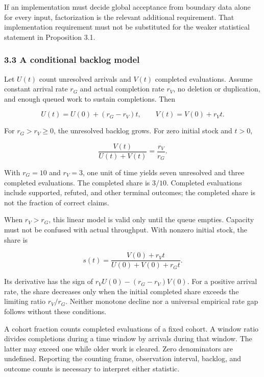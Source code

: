 \documentclass[
  10pt,
]{article}
\begin{document}
If an implementation must decide global acceptance from boundary data alone for every input, factorization is the relevant additional requirement. That implementation requirement must not be substituted for the weaker statistical statement in Proposition 3.1.

\subsubsection{3.3 A conditional backlog model}\label{a-conditional-backlog-model}

Let \hypertarget{math-E0055-0059}{}{\(U(t)\)} count unresolved arrivals and \hypertarget{math-E0056-0060}{}{\(V(t)\)} completed evaluations. Assume constant arrival rate \hypertarget{math-E0057-0061}{}{\(r_G\)} and actual completion rate \hypertarget{math-E0058-0062}{}{\(r_V\)}, no deletion or duplication, and enough queued work to sustain completions. Then

\hypertarget{math-E0059-0063}{}{\[U(t)=U(0)+(r_G-r_V)t,\qquad V(t)=V(0)+r_Vt.\]}

For \hypertarget{math-E0060-0064}{}{\(r_G>r_V\ge0\)}, the unresolved backlog grows. For zero initial stock and \hypertarget{math-E0061-0065}{}{\(t>0\)},

\hypertarget{math-E0062-0066}{}{\[\frac{V(t)}{U(t)+V(t)}=\frac{r_V}{r_G}.\]}

With \hypertarget{math-E0063-0067}{}{\(r_G=10\)} and \hypertarget{math-E0064-0068}{}{\(r_V=3\)}, one unit of time yields seven unresolved and three completed evaluations. The completed share is \hypertarget{math-E0065-0069}{}{\(3/10\)}. Completed evaluations include supported, refuted, and other terminal outcomes; the completed share is not the fraction of correct claims.

When \hypertarget{math-E0066-0070}{}{\(r_V>r_G\)}, this linear model is valid only until the queue empties. Capacity must not be confused with actual throughput. With nonzero initial stock, the share is

\hypertarget{math-E0067-0071}{}{\[s(t)=\frac{V(0)+r_Vt}{U(0)+V(0)+r_Gt}.\]}

Its derivative has the sign of \hypertarget{math-E0068-0072}{}{\(r_VU(0)-(r_G-r_V)V(0)\)}. For a positive arrival rate, the share decreases only when the initial completed share exceeds the limiting ratio \hypertarget{math-E0069-0073}{}{\(r_V/r_G\)}. Neither monotone decline nor a universal empirical rate gap follows without these conditions.

A cohort fraction counts completed evaluations of a fixed cohort. A window ratio divides completions during a time window by arrivals during that window. The latter may exceed one while older work is cleared. Zero denominators are undefined. Reporting the counting frame, observation interval, backlog, and outcome counts is necessary to interpret either statistic.
\end{document}
